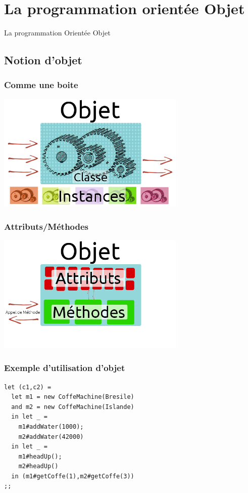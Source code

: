 \section{La programmation orientée Objet}
\begin{frame}
	\begin{center}
	\huge
	La programmation Orientée Objet
	\end{center}
\end{frame}

\subsection{Notion d'objet} %
\begin{frame}
	\frametitle{Comme une boite}
	\begin{center}
	\includegraphics[width=9cm]{pics/explObj1.png}
	\end{center}
\end{frame}
\begin{frame}
	\frametitle{Attributs/Méthodes}
	\begin{center}
	\includegraphics[width=9cm]{pics/explObj2.png}
	\end{center}
\end{frame}
\begin{frame}[fragile]
	\frametitle{Exemple d'utilisation d'objet}
	\begin{lstlisting}
let (c1,c2) =
  let m1 = new CoffeMachine(Bresile)
  and m2 = new CoffeMachine(Islande)
  in let _ = 
    m1#addWater(1000);
    m2#addWater(42000)
  in let _ =
    m1#headUp();
    m2#headUp()
  in (m1#getCoffe(1),m2#getCoffe(3))
;;
	\end{lstlisting}
\end{frame}

